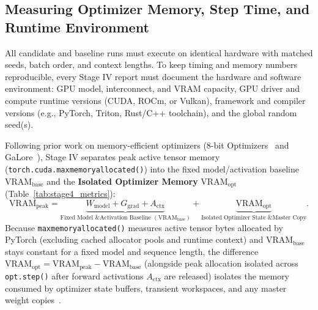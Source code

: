 \documentclass[11pt,a4paper]{article}
\renewcommand{\_}{\origunderscore\allowbreak}
\begin{document}
\subsection{Measuring Optimizer Memory, Step Time, and Runtime Environment}
\noindent
All candidate and baseline runs must execute on identical hardware with matched seeds, batch order, and context lengths. To keep timing and memory numbers reproducible, every Stage IV report must document the hardware and software environment: GPU model, interconnect, and VRAM capacity, GPU driver and compute runtime versions (CUDA, ROCm, or Vulkan), framework and compiler versions (e.g., PyTorch, Triton, Rust/C++ toolchain), and the global random seed(s).

Following prior work on memory-efficient optimizers (8-bit Optimizers~\cite{dettmers2022eightbit} and GaLore~\cite{zhao2024galore}), Stage IV separates peak active tensor memory (\texttt{torch.cuda.max\_memory\_allocated()}) into the fixed model/activation baseline $\text{VRAM}_{\text{base}}$ and the \textbf{Isolated Optimizer Memory} $\text{VRAM}_{\text{opt}}$ (Table~\ref{tab:stage4_metrics}):
\begin{equation}
    \text{VRAM}_{\text{peak}} = \underbrace{W_{\text{model}} + G_{\text{grad}} + A_{\text{ctx}}}_{\text{Fixed Model \& Activation Baseline } (\text{VRAM}_{\text{base}})} + \underbrace{\text{VRAM}_{\text{opt}}}_{\text{Isolated Optimizer State \& Master Copy}}.
\end{equation}
Because \texttt{max\_memory\_allocated()} measures active tensor bytes allocated by PyTorch (excluding cached allocator pools and runtime context) and $\text{VRAM}_{\text{base}}$ stays constant for a fixed model and sequence length, the difference $\text{VRAM}_{\text{opt}} = \text{VRAM}_{\text{peak}} - \text{VRAM}_{\text{base}}$ (alongside peak allocation isolated across \texttt{opt.step()} after forward activations $A_{\text{ctx}}$ are released) isolates the memory consumed by optimizer state buffers, transient workspaces, and any master weight copies~\cite{zhao2024galore,dettmers2022eightbit}.
\end{document}
